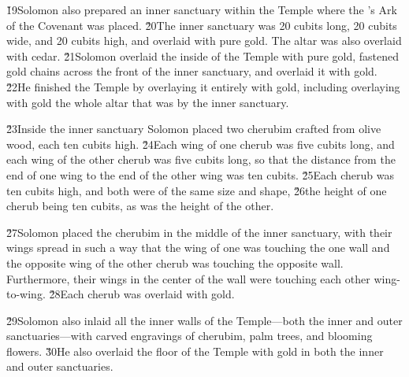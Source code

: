 \v{19}Solomon also prepared an inner sanctuary within the Temple where the 's Ark of the Covenant was placed. \v{20}The inner sanctuary was 20 cubits long, 20 cubits wide, and 20 cubits high, and overlaid with pure gold. The altar was also overlaid with cedar. \v{21}Solomon overlaid the inside of the Temple with pure gold, fastened gold chains across the front of the inner sanctuary, and overlaid it with gold. \v{22}He finished the Temple by overlaying it entirely with gold, including overlaying with gold the whole altar that was by the inner sanctuary.

\v{23}Inside the inner sanctuary Solomon placed two cherubim crafted from olive wood, each ten cubits high. \v{24}Each wing of one cherub was five cubits long, and each wing of the other cherub was five cubits long, so that the distance from the end of one wing to the end of the other wing was ten cubits. \v{25}Each cherub was ten cubits high, and both were of the same size and shape, \v{26}the height of one cherub being ten cubits, as was the height of the other.

\v{27}Solomon placed the cherubim in the middle of the inner sanctuary, with their wings spread in such a way that the wing of one was touching the one wall and the opposite wing of the other cherub was touching the opposite wall. Furthermore, their wings in the center of the wall were touching each other wing-to-wing. \v{28}Each cherub was overlaid with gold.

\v{29}Solomon also inlaid all the inner walls of the Temple---both the inner and outer sanctuaries---with carved engravings of cherubim, palm trees, and blooming flowers. \v{30}He also overlaid the floor of the Temple with gold in both the inner and outer sanctuaries.

